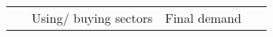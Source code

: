 \documentclass[12pt,english]{article}
\begin{document}
\begin{table}[!t]
	\centering
	\begin{adjustbox}{width=\textwidth}
		\renewcommand*{\arraystretch}{1.15}
		\small
		\begin{tabular}{cr|ccccc|b{30pt}b{30pt}p{30pt}b{30pt}b{30pt}|c|c}
			\multicolumn{2}{c}{\ }		& \multicolumn{5}{c}{Using/ buying sectors} & \multicolumn{5}{c}{Final demand}  &  \multicolumn{2}{c}{\ }	   \\
			

\end{tabular}
\end{adjustbox}
\end{table}
\end{document}
